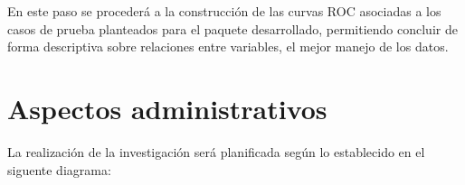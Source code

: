 En este paso se procederá a la construcción de las curvas ROC asociadas a los casos de prueba planteados para el paquete desarrollado, permitiendo concluir de forma descriptiva  sobre  relaciones entre variables, el mejor manejo de los datos.\\


\section{Aspectos administrativos}

\vspace{1 cm}
La realización de la investigación será planificada según lo establecido en el siguente diagrama:\\

\begin{figure}[!ht]
\begin{center}


\end{center}
\end{figure}
